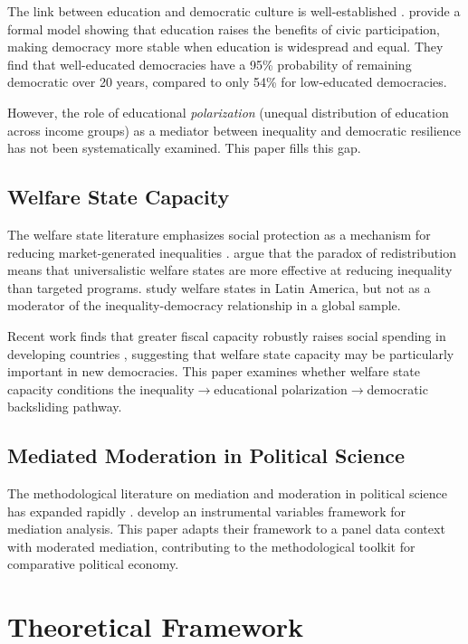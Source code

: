 \documentclass[11pt,letterpaper]{article}
\begin{document}
The link between education and democratic culture is well-established \citep{Glaeser2007, Dahl1971}. \cite{Glaeser2007} provide a formal model showing that education raises the benefits of civic participation, making democracy more stable when education is widespread and equal. They find that well-educated democracies have a 95\% probability of remaining democratic over 20 years, compared to only 54\% for low-educated democracies.

However, the role of educational \textit{polarization} (unequal distribution of education across income groups) as a mediator between inequality and democratic resilience has not been systematically examined. This paper fills this gap.

\subsection{Welfare State Capacity}

The welfare state literature emphasizes social protection as a mechanism for reducing market-generated inequalities \citep{Korpi1998, Huber2012}. \cite{Korpi1998} argue that the paradox of redistribution means that universalistic welfare states are more effective at reducing inequality than targeted programs. \cite{Huber2012} study welfare states in Latin America, but not as a moderator of the inequality-democracy relationship in a global sample.

Recent work finds that greater fiscal capacity robustly raises social spending in developing countries \citep{Tang2020}, suggesting that welfare state capacity may be particularly important in new democracies. This paper examines whether welfare state capacity conditions the inequality$\rightarrow$educational polarization$\rightarrow$democratic backsliding pathway.

\subsection{Mediated Moderation in Political Science}

The methodological literature on mediation and moderation in political science has expanded rapidly \citep{Bullock2011, Dippel2017}. \cite{Dippel2017} develop an instrumental variables framework for mediation analysis. This paper adapts their framework to a panel data context with moderated mediation, contributing to the methodological toolkit for comparative political economy.

\section{Theoretical Framework}
\end{document}
